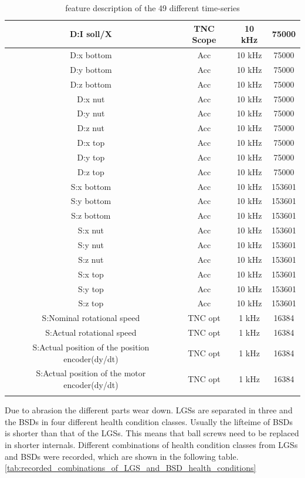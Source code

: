 \begin{center}
\begin{longtable}{||c c c c||}
 D:I soll/X & TNC Scope & 10 kHz & 75000 \\ 
 \hline
 D:x bottom & Acc & 10 kHz & 75000 \\ 
  \hline
 D:y bottom & Acc & 10 kHz & 75000 \\ 
 \hline
 D:z bottom & Acc & 10 kHz & 75000 \\ 
 \hline
 D:x nut & Acc & 10 kHz & 75000 \\ 
 \hline
 D:y nut & Acc & 10 kHz & 75000 \\ 
 \hline
 D:z nut & Acc & 10 kHz & 75000 \\ 
 \hline
 D:x top & Acc & 10 kHz & 75000 \\
  \hline
 D:y top & Acc & 10 kHz & 75000 \\ 
 \hline
 D:z top & Acc & 10 kHz & 75000 \\ 
 \hline
 S:x bottom & Acc & 10 kHz & 153601 \\ 
 \hline
 S:y bottom & Acc & 10 kHz & 153601 \\ 
 \hline
 S:z bottom & Acc & 10 kHz & 153601 \\ 
 \hline
 S:x nut & Acc & 10 kHz & 153601 \\ 
  \hline
 S:y nut & Acc & 10 kHz & 153601 \\ 
 \hline
 S:z nut & Acc & 10 kHz & 153601 \\ 
 \hline
 S:x top & Acc & 10 kHz & 153601 \\ 
 \hline
 S:y top & Acc & 10 kHz & 153601 \\ 
 \hline
 S:z top & Acc & 10 kHz & 153601 \\ 
 \hline
 S:Nominal rotational speed & TNC opt & 1 kHz & 16384 \\
  \hline
 S:Actual rotational speed & TNC opt & 1 kHz & 16384 \\ 
 \hline
 S:Actual position of the position encoder(dy/dt) & TNC opt & 1 kHz & 16384 \\ 
 \hline
 S:Actual position of the motor encoder(dy/dt)  & TNC opt & 1 kHz & 16384  \\ [1ex] 
 \hline
\caption {feature description of the 49 different time-series}
\label {tab:description_of_the_49_recorded_features}
\end{longtable}
\end{center}

Due to abrasion the different parts wear down. LGSs are separated in three and the BSDs in four different health condition classes. Usually the lifteime of BSDs is shorter than that of the LGSs. This means that ball screws need to be replaced in shorter internals. Different combinations of health condition classes from LGSs and BSDs were recorded, which are shown in the following table. \ref{tab:recorded_combinations_of_LGS_and_BSD_health_conditions}

